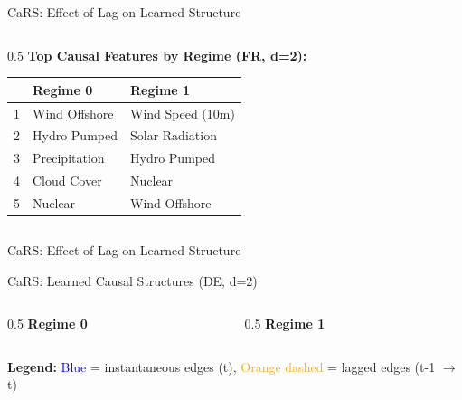 \documentclass[aspectratio=169]{beamer}
\begin{document}
\begin{frame}{CaRS: Effect of Lag on Learned Structure}
\begin{columns}
\begin{column}{0.5\textwidth}
\vspace{0.2cm}
\textbf{Top Causal Features by Regime (FR, d=2):}
\scriptsize
\begin{tabular}{l|ll}
\toprule
& \textbf{Regime 0} & \textbf{Regime 1} \\
\midrule
1 & Wind Offshore & Wind Speed (10m) \\
2 & Hydro Pumped & Solar Radiation \\
3 & Precipitation & Hydro Pumped \\
4 & Cloud Cover & Nuclear \\
5 & Nuclear & Wind Offshore \\
\bottomrule
\end{tabular}
\normalsize
\end{column}
\end{columns}
\end{frame}

\begin{frame}{CaRS: Effect of Lag on Learned Structure}
\begin{center}
\end{center}
\end{frame}

\begin{frame}{CaRS: Learned Causal Structures (DE, d=2)}
\begin{columns}
\begin{column}{0.5\textwidth}
\centering
\textbf{Regime 0}
\vspace{0.2cm}

\end{column}
\begin{column}{0.5\textwidth}
\centering
\textbf{Regime 1}
\vspace{0.2cm}

\end{column}
\end{columns}
\vspace{0.3cm}
\small
\textbf{Legend:} \textcolor{blue}{Blue} = instantaneous edges (t), \textcolor{orange}{Orange dashed} = lagged edges (t-1 $\rightarrow$ t)
\end{frame}
\end{document}
